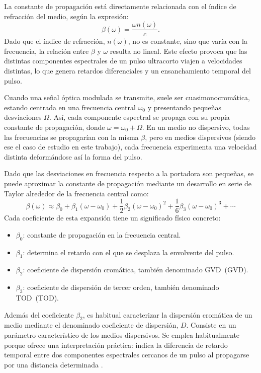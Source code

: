 La constante de propagación está directamente relacionada con el índice de refracción del medio, según la expresión:
\begin{equation}
\beta(\omega) = \frac{\omega n(\omega)}{c}.
\end{equation}
Dado que el índice de refracción, $n(\omega)$, no es constante, sino que varía con la frecuencia, la relación entre $\beta$ y $\omega$ resulta no lineal. Este efecto provoca que las distintas componentes espectrales de un pulso ultracorto viajen a velocidades distintas, lo que genera retardos diferenciales y un ensanchamiento temporal del pulso.

Cuando una señal óptica modulada se transmite, suele ser cuasimonocromática, estando centrada en una frecuencia central $\omega_{0}$ y presentando pequeñas desviaciones $\Omega$. Así, cada componente espectral se propaga con su propia constante de propagación, donde $\omega = \omega_{0} + \Omega$. En un medio no dispersivo, todas las frecuencias se propagarían con la misma $\beta$, pero en medios dispersivos (siendo ese el caso de estudio en este trabajo), cada frecuencia experimenta una velocidad distinta deformándose así la forma del pulso.

Dado que las desviaciones en frecuencia respecto a la portadora son pequeñas, se puede aproximar la constante de propagación mediante un desarrollo en serie de Taylor alrededor de la frecuencia central como:
\begin{equation}
\beta(\omega) \approx \beta_{0} + \beta_{1}(\omega - \omega_{0}) + \frac{1}{2}\beta_{2}(\omega - \omega_{0})^{2} + \frac{1}{6}\beta_{3}(\omega - \omega_{0})^{3} + \dotsb
\end{equation}
Cada coeficiente de esta expansión tiene un significado físico concreto:
\begin{itemize}
  \item $\beta_{0}$: constante de propagación en la frecuencia central.
  \item $\beta_{1}$: determina el retardo con el que se desplaza la envolvente del pulso.
  \item $\beta_{2}$: coeficiente de dispersión cromática, también denominado \acs{GVD}~(\acl{GVD}).
  \item $\beta_{3}$: coeficiente de dispersión de tercer orden, también denominado \acs{TOD}~(\acl{TOD}). 
\end{itemize}


Además del coeficiente $\beta_{2}$, es habitual caracterizar la dispersión cromática de un medio mediante el denominado coeficiente de dispersión, $D$. Consiste en un parámetro característico de los medios dispersivos. Se emplea habitualmente porque ofrece una interpretación práctica: indica la diferencia de retardo temporal entre dos componentes espectrales cercanos de un pulso al propagarse por una distancia determinada \cite{España}. 

